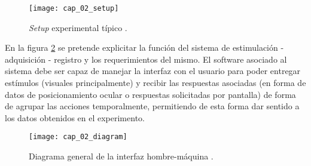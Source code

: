 \documentclass[../main.tex]{subfiles}
\begin{document}
		\begin{figure}[H]
			\centering
			\texttt{[image: cap\_02\_setup]}
			\caption[\textit{Setup} experimental típico]{\textit{Setup} experimental típico \cite{article:baseInfo}.}
			\label{fig:02_ejemplo_setup}
		\end{figure}

		En la figura \ref{fig:02_diagrama_interfaz} se pretende explicitar la función del sistema de estimulación - adquisición - registro y los requerimientos del mismo. El software asociado al sistema debe ser capaz de manejar la interfaz con el usuario para poder entregar estímulos (visuales principalmente) y recibir las respuestas asociadas (en forma de datos de posicionamiento ocular o respuestas solicitadas por pantalla) de forma de agrupar las acciones temporalmente, permitiendo de esta forma dar sentido a los datos obtenidos en el experimento. 
		
		\begin{figure}[H]
			\centering
			\texttt{[image: cap\_02\_diagram]}
			\caption[Diagrama general de la interfaz hombre-máquina]{Diagrama general de la interfaz hombre-máquina \cite{article:baseInfo}.}
			\label{fig:02_diagrama_interfaz}
		\end{figure}

\end{document}
